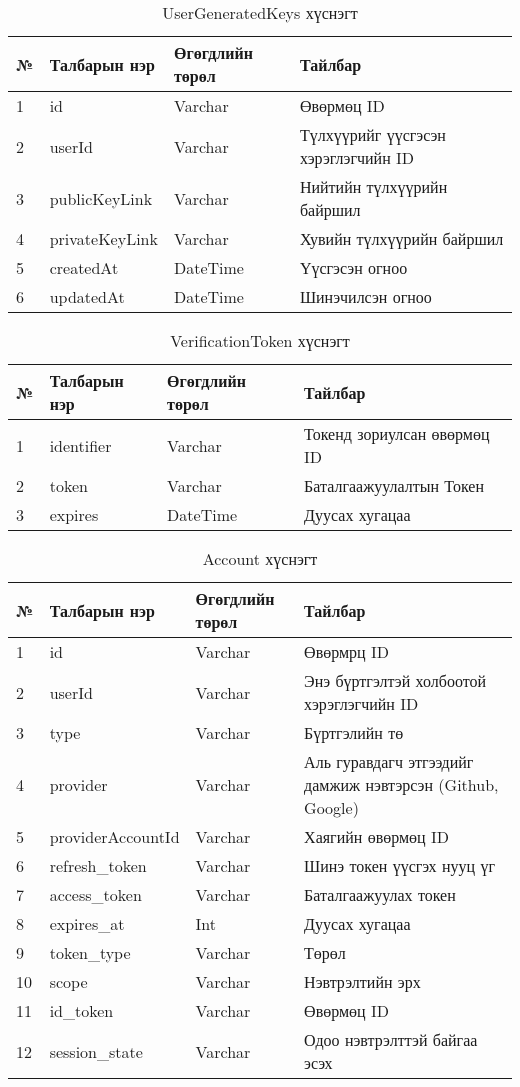 \begin{table}[h]
	\caption{UserGeneratedKeys хүснэгт}
	\begin{tabular}{|l|l|l|p{8cm}|}
	\hline
	№ &  Талбарын нэр & Өгөгдлийн төрөл & Тайлбар \\ \hline
	1 &  id & Varchar & Өвөрмөц ID\\ \hline
	2 &  userId & Varchar & Түлхүүрийг үүсгэсэн хэрэглэгчийн ID \\ \hline
	3 &  publicKeyLink & Varchar & Нийтийн түлхүүрийн байршил \\ \hline
	4 &  privateKeyLink & Varchar & Хувийн түлхүүрийн байршил \\ \hline
	5 &  createdAt & DateTime & Үүсгэсэн огноо \\ \hline
	6 &  updatedAt & DateTime & Шинэчилсэн огноо \\ \hline
\end{tabular}
\end{table}
\begin{table}[h]
	\caption{VerificationToken хүснэгт}
	\begin{tabular}{|l|l|l|p{8cm}|}
	\hline
	№ &  Талбарын нэр & Өгөгдлийн төрөл & Тайлбар \\ \hline
	1 &  identifier & Varchar & Токенд зориулсан өвөрмөц ID\\ \hline
	2 &  token & Varchar & Баталгаажуулалтын Токен \\ \hline
	3 &  expires & DateTime & Дуусах хугацаа \\ \hline
\end{tabular}
\end{table}

\begin{table}[h]
	\caption{Account хүснэгт}
	\begin{tabular}{|l|l|l|p{8cm}|}
	\hline
	№ &  Талбарын нэр & Өгөгдлийн төрөл & Тайлбар \\ \hline
	1 &  id & Varchar & Өвөрмрц ID \\ \hline
	2 &  userId & Varchar & Энэ бүртгэлтэй холбоотой хэрэглэгчийн ID \\ \hline
	3 &  type & Varchar & Бүртгэлийн тө \\ \hline
	4 &  provider & Varchar & Аль гуравдагч этгээдийг дамжиж нэвтэрсэн (Github, Google) \\ \hline
	5 &  providerAccountId & Varchar & Хаягийн өвөрмөц ID \\ \hline
    6 &  refresh\_token & Varchar & Шинэ токен үүсгэх нууц үг\\ \hline
    7 &  access\_token & Varchar & Баталгаажуулах токен \\ \hline
    8 &  expires\_at & Int & Дуусах хугацаа\\ \hline
    9 &  token\_type & Varchar & Төрөл \\ \hline
    10 &  scope & Varchar & Нэвтрэлтийн эрх \\ \hline
    11 &  id\_token & Varchar & Өвөрмөц ID \\ \hline
    12 &  session\_state & Varchar & Одоо нэвтрэлттэй байгаа эсэх\\ \hline
\end{tabular}
\end{table}

